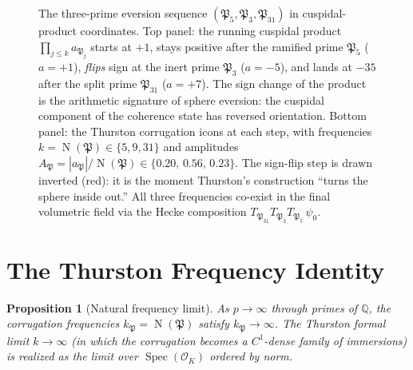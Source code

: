 \documentclass[11pt,a4paper]{article}
\theoremstyle{plain}
\newtheorem{proposition}[theorem]{Proposition}
\theoremstyle{definition}
\theoremstyle{remark}
\numberwithin{equation}{section}
\providecommand{\QQ}{\mathbb{Q}}
\providecommand{\cO}{\mathcal{O}}
\providecommand{\fP}{\mathfrak{P}}
\DeclareMathOperator{\Spec}{Spec}
\DeclareMathOperator{\Nm}{N}
\begin{document}
\begin{figure}[h]
\caption{The three-prime eversion sequence
$(\fP_5,\fP_3,\fP_{31})$ in cuspidal-product coordinates.  Top
panel: the running cuspidal product
$\prod_{j\le k} a_{\fP_j}$ starts at $+1$, stays positive after the
ramified prime $\fP_5$ ($a=+1$), \emph{flips} sign at the inert
prime $\fP_3$ ($a=-5$), and lands at $-35$ after the split prime
$\fP_{31}$ ($a=+7$).  The sign change of the product is the
arithmetic signature of sphere eversion: the cuspidal component of
the coherence state has reversed orientation.  Bottom panel: the
Thurston corrugation icons at each step, with frequencies
$k = \Nm(\fP) \in \{5, 9, 31\}$ and amplitudes
$A_\fP = |a_\fP|/\Nm(\fP) \in \{0.20,\,0.56,\,0.23\}$.  The
sign-flip step is drawn inverted (red): it is the moment Thurston's
construction ``turns the sphere inside out.''  All three frequencies
co-exist in the final volumetric field via the Hecke composition
$T_{\fP_{31}} T_{\fP_3} T_{\fP_5}\,\psi_0$.}
\label{fig:eversion-trajectory}
\end{figure}

\section{The Thurston Frequency Identity}\label{sec:thurston-identity}

\begin{proposition}[Natural frequency limit]
As $p \to \infty$ through primes of $\QQ$, the corrugation frequencies
$k_\fP = \Nm(\fP)$ satisfy $k_\fP \to \infty$.  The Thurston formal limit
$k \to \infty$ (in which the corrugation becomes a $C^1$-dense family of
immersions) is realized as the limit over $\Spec(\cO_K)$ ordered by norm.
\end{proposition}
\end{document}
